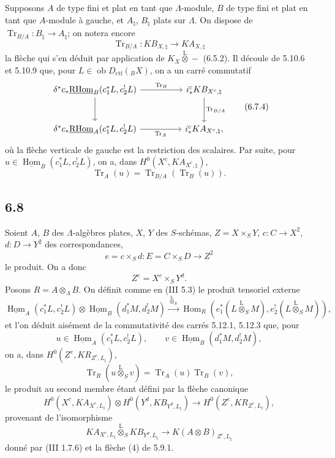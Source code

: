\documentclass[11pt]{article}
\DeclareMathOperator{\Hom}{Hom}
\newcommand{\R}{\mathrm{R}}\newcommand{\RHomCore}{\mathrm{RHom}}
\providecommand{\RHom}{\RHomCore}
\providecommand{\uRHom}{\underline{\RHom}}
\providecommand{\uHom}{\underline{\Hom}}
\providecommand{\Tr}{\operatorname{Tr}}
\providecommand{\Tr}{\operatorname{Tr}}
\providecommand{\lten}{\overset{\mathrm L}{\otimes}}
\providecommand{\Ob}{\operatorname{ob}}
\providecommand{\Tr}{\operatorname{Tr}}
\providecommand{\RHom}{\RHomCore}
\providecommand{\Hom}{\operatorname{Hom}}
\providecommand{\lten}{\overset{\mathrm L}{\otimes}}
\providecommand{\RHom}{\R\mathcal{H}om}
\providecommand{\lten}{\overset{\mathrm L}{\otimes}}
\providecommand{\Ob}{\operatorname{ob}}
\providecommand{\R}{\mathrm R}
\providecommand{\Tr}{\operatorname{Tr}}
\providecommand{\lten}{\overset{\mathrm L}{\otimes}}
\providecommand{\lten}{\overset{\mathrm L}{\otimes}}
\providecommand{\Ob}{\operatorname{Ob}}
\providecommand{\lten}{\overset{\mathrm L}{\otimes}}
\providecommand{\RHom}{\RHomCore}
\providecommand{\Hom}{\operatorname{Hom}}
\providecommand{\Tr}{\operatorname{Tr}}
\providecommand{\Ob}{\operatorname{ob}}
\providecommand{\Ob}{\operatorname{Ob}}
\providecommand{\lten}{\overset{\mathrm L}{\otimes}}
\begin{document}
Supposons $A$ de type fini et plat en tant que $\Lambda$-module, $B$ de type fini et plat en tant que $A$-module à gauche, et $A_{\natural}$, $B_{\natural}$ plats sur $\Lambda$. On dispose de $\Tr_{B/A}:B_{\natural}\to A_{\natural}$; on notera encore
\begin{equation}
\Tr_{B/A}:KB_{X,\natural}\longrightarrow KA_{X,\natural}
\tag{6.7.3}
\end{equation}
la flèche qui s'en déduit par application de $K_X\lten -$ (6.5.2). Il découle de 5.10.6 et 5.10.9 que, pour $L\in\Ob D_{\mathrm{ctf}}({}_BX)$, on a un carré commutatif
\begin{equation}
\begin{tikzcd}[column sep=huge,row sep=large]
\delta^*c_*\uRHom_B(c_1^*L,c_2^!L) \arrow[r,"\Tr_B"] \arrow[d]
& i_*^cKB_{X^c,\natural} \arrow[d,"\Tr_{B/A}"]\\
\delta^*c_*\uRHom_A(c_1^*L,c_2^!L) \arrow[r,"\Tr_A"']
& i_*^cKA_{X^c,\natural},
\end{tikzcd}
\tag{6.7.4}
\end{equation}
où la flèche verticale de gauche est la restriction des scalaires. Par suite, pour $u\in\uHom_B(c_1^*L,c_2^!L)$, on a, dans $H^0(X^c,KA_{X^c,\natural})$,
\begin{equation}
\Tr_A(u)=\Tr_{B/A}(\Tr_B(u)).
\tag{6.7.5}
\end{equation}

\subsection*{6.8}
Soient $A$, $B$ des $\Lambda$-algèbres plates, $X$, $Y$ des $S$-schémas, $Z=X\times_SY$, $c:C\to X^2$, $d:D\to Y^2$ des correspondances,
\[
e=c\times_Sd:E=C\times_SD\longrightarrow Z^2
\]
le produit. On a donc
\[
Z^e=X^c\times_SY^d.
\]
Posons $R=A\otimes_{\Lambda}B$. On définit comme en (III 5.3) le produit tensoriel externe
\begin{equation}
\uHom_A(c_1^*L,c_2^!L)\otimes \uHom_B(d_1^*M,d_2^!M)
\xrightarrow{\ \lten_S\ }
\Hom_R(e_1^*(L\lten_SM),e_2^!(L\lten_SM)),
\tag{6.8.1}
\end{equation}
et l'on déduit aisément de la commutativité des carrés 5.12.1, 5.12.3 que, pour
\[
u\in\uHom_A(c_1^*L,c_2^!L),\qquad v\in\uHom_B(d_1^*M,d_2^!M),
\]
on a, dans $H^0(Z^e,KR_{Z^e,L_{\natural}})$,
\begin{equation}
\Tr_R(u\lten_Sv)=\Tr_A(u)\Tr_B(v),
\tag{6.8.2}
\end{equation}
le produit au second membre étant défini par la flèche canonique
\begin{equation}
H^0(X^c,KA_{X^c,L_{\natural}})\otimes
H^0(Y^d,KB_{Y^d,L_{\natural}})
\longrightarrow
H^0(Z^e,KR_{Z^e,L_{\natural}}),
\tag{6.8.3}
\end{equation}
provenant de l'isomorphisme
\[
KA_{X^c,L_{\natural}}\lten_S KB_{Y^d,L_{\natural}}\longrightarrow K(A\otimes B)_{Z^e,L_{\natural}}
\]
donné par (III 1.7.6) et la flèche (4) de 5.9.1.
\end{document}
